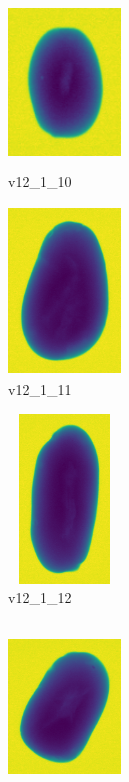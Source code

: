\documentclass[11pt]{article}
\begin{document}
\begin{figure}
          \begin{subfigure}[b]{0.15\textwidth}
         \centering
         \includegraphics[width=3cm, height=4.5cm]{images/kartofler/v12_1_10_cut.png}
         \caption{v12\_1\_10}
         \label{fig:y equals x}
     \end{subfigure}
     \hfill
     \begin{subfigure}[b]{0.15\textwidth}
         \centering
         \includegraphics[width=3cm, height=4.5cm]{images/kartofler/v12_1_11_cut.png}
        \caption{v12\_1\_11}
         \label{fig:three sin x}
     \end{subfigure}
     \hfill
     \begin{subfigure}[b]{0.15\textwidth}
         \centering
         \includegraphics[width=3cm, height=4.5cm]{images/kartofler/v12_1_12_cut.png}
        \caption{v12\_1\_12}
         \label{fig:five over x}
     \end{subfigure}
     \hfill
    \begin{subfigure}[b]{0.15\textwidth}
         \centering
         \includegraphics[width=3cm, height=4.5cm]{images/kartofler/v12_1_13_cut.png}

\end{subfigure}
\end{figure}
\end{document}
